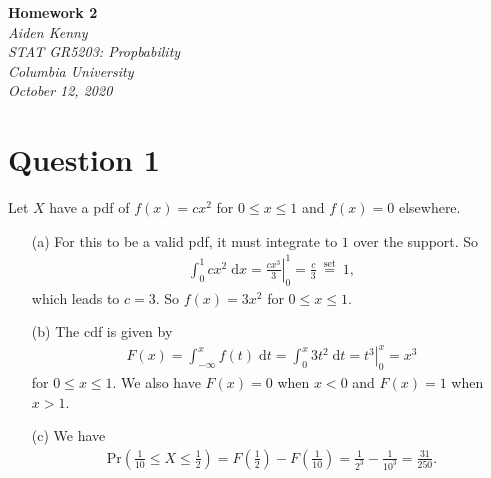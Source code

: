 \documentclass[10pt]{article}
\begin{document}
\newcommand{\mytitle}{Homework 2}
\newcommand{\myauthor}{Aiden Kenny}
\newcommand{\myclass}{STAT GR5203: Propbability}
\newcommand{\myschool}{Columbia University}
\newcommand{\mydate}{October 12, 2020}
\begin{flushright}
    \textbf{\mytitle}\\[0.5em]
    \textsl{\myauthor}\\
    \textsl{\myclass}\\
    \textsl{\myschool}\\
    \textsl{\mydate}
\end{flushright} \vspace{1em}

\section{Question 1} \noindent
Let \(X\) have a pdf of \(f(x) = c x^2\) for \(0 \le x \le 1\) and \(f(x) = 0\) elsewhere. 
\begin{itemize}
    \item[(a)] For this to be a valid pdf, it must integrate to \(1\) over the support. So 
    \begin{align*}
        \int_0^1 c x^2 \;\mathrm{d}x = \left. \frac{c x^3}{3} \right|_0^1 = \frac{c}{3} ~\overset{\text{set}}{=}~ 1,
    \end{align*}
    which leads to \(c = 3\). So \(f(x) = 3x^2\) for \(0 \le x \le 1\). 
    \item[(b)] The cdf is given by 
    \begin{align*}
        F(x) = \int_{-\infty}^x f(t) \;\mathrm{d}t = \int_0^x 3t^2 \;\mathrm{d}t = \left. t^3 \right|_0^x = x^3
    \end{align*}
    for \(0 \le x \le 1\). We also have \(F(x) = 0\) when \(x < 0\) and \(F(x) = 1\) when \(x > 1\).
    \item[(c)] We have 
    \begin{align*}
        \mathrm{Pr}\left(\frac{1}{10} \le X \le \frac{1}{2} \right) 
        = F\left( \frac{1}{2} \right) - F \left( \frac{1}{10} \right)
        = \frac{1}{2^3} - \frac{1}{10^3} = \frac{31}{250}.
    \end{align*}
\end{itemize}

\end{document}

